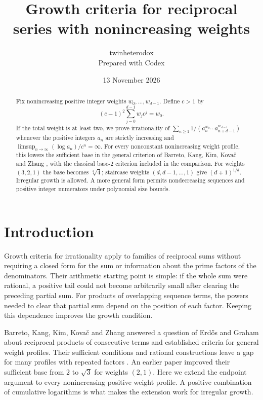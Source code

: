 \documentclass[11pt]{article}
\title{Growth criteria for reciprocal series with nonincreasing weights}
\author{twinheterodox\\[2pt]\normalsize Prepared with Codex}
\date{13 November 2026}
\numberwithin{equation}{section}
\begin{document}
\maketitle

\begin{abstract}
Fix nonincreasing positive integer weights $w_0,\ldots,w_{d-1}$.
Define $c>1$ by
\[
  (c-1)^2\sum_{j=0}^{d-1}w_jc^j=w_0.
\]
If the total weight is at least two, we prove irrationality of
$\sum_{n\ge1}1/(a_n^{w_0}\cdots a_{n+d-1}^{w_{d-1}})$ whenever the
positive integers $a_n$ are strictly increasing and
\mbox{$\limsup_{n\to\infty}(\log a_n)/c^n=\infty$}.
For every nonconstant nonincreasing weight profile, this lowers the
sufficient base in the general criterion of Barreto, Kang, Kim,
Kova\v{c} and Zhang \cite[Theorem~3]{BKKKZ}, with the classical
base-$2$ criterion included in the comparison.
For weights $(3,2,1)$ the base becomes $\sqrt[3]{4}$;
staircase weights $(d,d-1,\ldots,1)$ give $(d+1)^{1/d}$.
Irregular growth is allowed. A more general form permits nondecreasing
sequences and positive integer numerators under polynomial size bounds.
\end{abstract}

\section{Introduction}

Growth criteria for irrationality apply to families of reciprocal sums
without requiring a closed form for the sum or information about the
prime factors of the denominators. Their arithmetic starting point is
simple: if the whole sum were rational, a positive tail could not become
arbitrarily small after clearing the preceding partial sum. For products
of overlapping sequence terms, the powers needed to clear that partial
sum depend on the position of each factor. Keeping this dependence
improves the growth condition.

Barreto, Kang, Kim, Kova\v{c} and Zhang \cite{BKKKZ} answered a question
of Erd\H{o}s and Graham \cite[p.~64]{ErdosGraham} about reciprocal
products of consecutive terms and established criteria for general
weight profiles. Their sufficient conditions and rational constructions
leave a gap for many profiles with repeated factors
\cite[Section~5]{BKKKZ}. An earlier paper \cite{Earlier} improved their
sufficient base from $2$ to $\sqrt3$ for weights $(2,1)$.
Here we extend the endpoint argument to every nonincreasing positive
weight profile. A positive combination of cumulative logarithms is
what makes the extension work for irregular growth.
\end{document}
